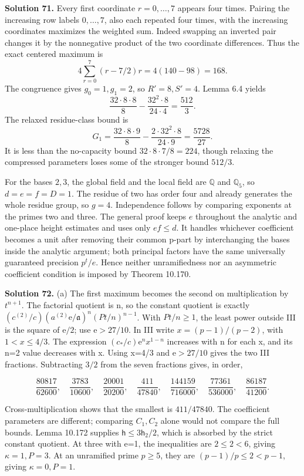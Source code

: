 \documentclass[
  11pt,
  a4paper,
]{article}
\begin{document}
\textbf{Solution 71.} Every first coordinate \(r=0,\ldots,7\) appears
four times. Pairing the increasing row labels \(0,\ldots,7\), also each
repeated four times, with the increasing coordinates maximizes the
weighted sum. Indeed swapping an inverted pair changes it by the
nonnegative product of the two coordinate differences. Thus the exact
centered maximum is \[
4\sum_{r=0}^{7}(r-7/2)r
=4(140-98)=168.
\] The congruence gives \(g_0=1,g_1=2\), so \(R'=8,S'=4\). Lemma 6.4
yields \[
\frac{32\cdot8\cdot8}{8}
-\frac{32^2\cdot8}{24\cdot4}
=\frac{512}{3}.
\] The relaxed residue-class bound is \[
G_1=\frac{32\cdot8\cdot9}{8}
-\frac{2\cdot32^2\cdot8}{24\cdot9}
=\frac{5728}{27}.
\] It is less than the no-capacity bound \(32\cdot8\cdot7/8=224\),
though relaxing the compressed parameters loses some of the stronger
bound \(512/3\).

For the bases \(2,3\), the global field and the local field are
\(\mathbb Q\) and \(\mathbb Q_5\), so \(d=e=f=D=1\). The residue of two
has order four and already generates the whole residue group, so
\(g=4\). Independence follows by comparing exponents at the primes two
and three. The general proof keeps \(e\) throughout the analytic and
one-place height estimates and uses only \(ef\le d\). It handles
whichever coefficient becomes a unit after removing their common p-part
by interchanging the bases inside the analytic argument; both principal
factors have the same universally guaranteed precision \(p^t/e\). Hence
neither unramifiedness nor an asymmetric coefficient condition is
imposed by Theorem 10.170.

\textbf{Solution 72.} (a) The first maximum becomes the second on
multiplication by \(t^{n+1}\). The factorial quotient is n, so the
constant quotient is exactly
\((c^{(2)}/c)(a^{(2)}\mathrm e/\mathfrak a)^n(Pt/n)^{n-1}\). With
\(Pt/n\ge1\), the least power outside III is the square of
\(\mathrm e/2\); use \(\mathrm e>27/10\). In III write
\(x=(p-1)/(p-2)\), with \(1<x\le4/3\). The expression
\((c_*/c)\mathrm e^n x^{1-n}\) increases with n for each x, and its n=2
value decreases with x. Using x=4/3 and \(\mathrm e>27/10\) gives the
two III fractions. Subtracting \(3/2\) from the seven fractions gives,
in order,

\[
\frac{80817}{62600},\quad\frac{3783}{10600},\quad
\frac{20001}{20200},\quad\frac{411}{47840},\quad
\frac{144159}{716000},\quad\frac{77361}{536000},\quad
\frac{86187}{41200}.
\tag{10.657}
\]

Cross-multiplication shows that the smallest is \(411/47840\). The
coefficient parameters are different; comparing \(C_1,C_2\) alone would
not compare the full bounds. Lemma 10.172 supplies
\(\mathsf h\le3\mathsf h_2/2\), which is absorbed by the strict constant
quotient. At three with e=1, the inequalities are \(2\le2<6\), giving
\(\kappa=1,P=3\). At an unramified prime \(p\ge5\), they are
\((p-1)/p\le2<p-1\), giving \(\kappa=0,P=1\).
\end{document}
